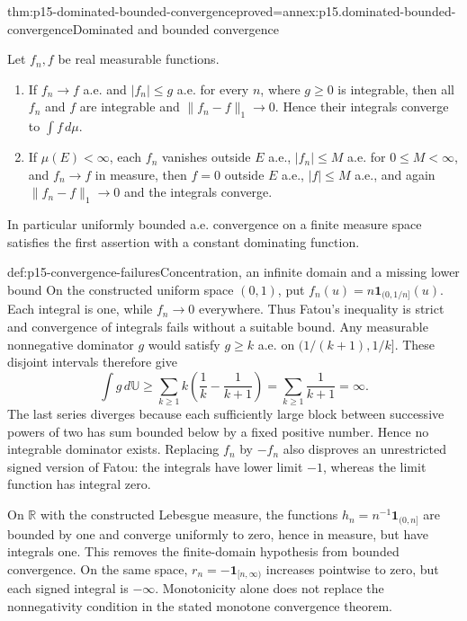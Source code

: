 \begin{hbtheorem}{thm:p15-dominated-bounded-convergence}{proved=annex:p15.dominated-bounded-convergence}{Dominated and bounded convergence}
\par\nobreak
Let \(f_n,f\) be real measurable functions.
\begin{enumerate}
\item If \(f_n\to f\) a.e. and \(|f_n|\leq g\) a.e. for every
      \(n\), where \(g\geq0\) is integrable, then all \(f_n\)
      and \(f\) are integrable and
      \(\|f_n-f\|_1\to0\). Hence their integrals converge to
      \(\int f\,d\mu\).
\item If \(\mu(E)<\infty\), each \(f_n\) vanishes outside \(E\)
      a.e., \(|f_n|\leq M\) a.e. for \(0\leq M<\infty\), and \(f_n\to f\)
      in measure, then \(f=0\) outside \(E\) a.e., \(|f|\leq M\)
      a.e., and again \(\|f_n-f\|_1\to0\) and the integrals converge.
\end{enumerate}
In particular uniformly bounded a.e. convergence on a finite measure
space satisfies the first assertion with a constant dominating function.
\end{hbtheorem}

\begin{hbexample}{def:p15-convergence-failures}{Concentration, an infinite domain and a missing lower bound}
On the constructed uniform space \((0,1)\), put
\(f_n(u)=n\mathbf1_{(0,1/n]}(u)\). Each integral is one, while
\(f_n\to0\) everywhere. Thus Fatou's inequality is strict and
convergence of integrals fails without a suitable bound. Any measurable
nonnegative dominator \(g\) would satisfy \(g\geq k\) a.e. on
\((1/(k+1),1/k]\). These disjoint intervals therefore give
\[
 \int g\,d\mathbb U\geq
 \sum_{k\geq1}k\left(\frac1k-\frac1{k+1}\right)
 =\sum_{k\geq1}\frac1{k+1}=\infty.
\]
The last series diverges because each sufficiently large block between
successive powers of two has sum bounded below by a fixed positive
number. Hence no integrable dominator exists. Replacing \(f_n\) by
\(-f_n\) also disproves an unrestricted signed version of Fatou:
the integrals have lower limit \(-1\), whereas the limit function has
integral zero.

On \(\mathbb R\) with the constructed Lebesgue measure, the functions
\(h_n=n^{-1}\mathbf1_{(0,n]}\) are bounded by one and converge uniformly
to zero, hence in measure, but have integrals one. This removes the
finite-domain hypothesis from bounded convergence. On the same space,
\(r_n=-\mathbf1_{[n,\infty)}\) increases pointwise to zero, but each
signed integral is \(-\infty\). Monotonicity alone does not replace
the nonnegativity condition in the stated monotone convergence theorem.
\end{hbexample}

